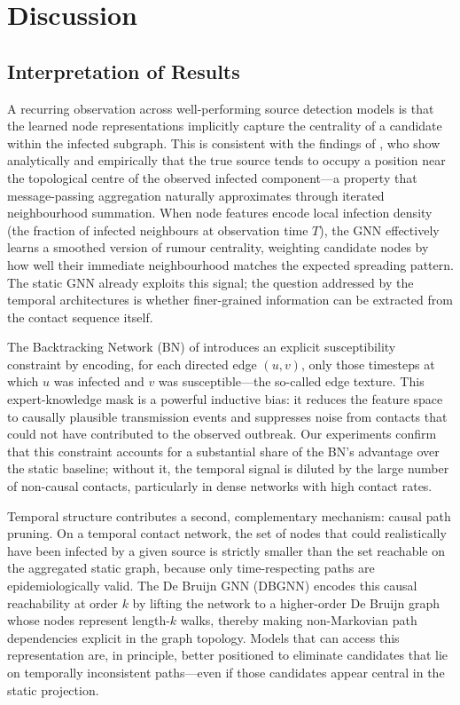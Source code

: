 \chapter{Discussion}
\label{c:chapter5}

\section{Interpretation of Results}
\label{st:interpretation}

A recurring observation across well-performing source detection models is that
the learned node representations implicitly capture the centrality of a
candidate within the infected subgraph. This is consistent with the findings of
\cite{Sterchi2025}, who show analytically and empirically that the true source
tends to occupy a position near the topological centre of the observed infected
component---a property that message-passing aggregation naturally approximates
through iterated neighbourhood summation. When node features encode local
infection density (the fraction of infected neighbours at observation time $T$),
the GNN effectively learns a smoothed version of rumour centrality, weighting
candidate nodes by how well their immediate neighbourhood matches the expected
spreading pattern. The static GNN already exploits this signal; the question
addressed by the temporal architectures is whether finer-grained information
can be extracted from the contact sequence itself.

The Backtracking Network (BN) of \cite{Ru2023} introduces an explicit
susceptibility constraint by encoding, for each directed edge $(u, v)$, only
those timesteps at which $u$ was infected and $v$ was susceptible---the
so-called edge texture. This expert-knowledge mask is a powerful inductive
bias: it reduces the feature space to causally plausible transmission events
and suppresses noise from contacts that could not have contributed to the
observed outbreak. Our experiments confirm that this constraint accounts for a
substantial share of the BN's advantage over the static baseline; without it,
the temporal signal is diluted by the large number of non-causal contacts,
particularly in dense networks with high contact rates.

Temporal structure contributes a second, complementary mechanism: causal path
pruning. On a temporal contact network, the set of nodes that could
realistically have been infected by a given source is strictly smaller than the
set reachable on the aggregated static graph, because only time-respecting
paths are epidemiologically valid. The De Bruijn GNN (DBGNN) \cite{Qarkaxhija2022}
encodes this causal reachability at order $k$ by lifting the network to a
higher-order De Bruijn graph whose nodes represent length-$k$ walks, thereby
making non-Markovian path dependencies explicit in the graph topology. Models
that can access this representation are, in principle, better positioned to
eliminate candidates that lie on temporally inconsistent paths---even if those
candidates appear central in the static projection.

